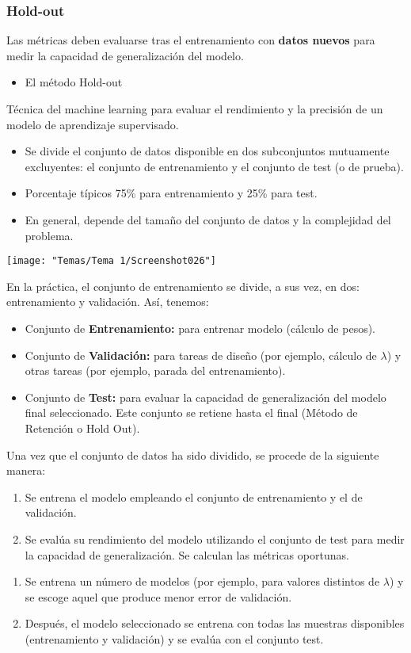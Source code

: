 \subsubsection{Hold-out}
Las métricas deben evaluarse tras el entrenamiento con \textbf{datos nuevos} para medir la capacidad de generalización del modelo. 
\begin{itemize}[label=\color{red}\textbullet, leftmargin=*]
	\item \color{lightblue}El método Hold-out
\end{itemize}
Técnica del machine learning para evaluar el rendimiento y la precisión de un modelo de aprendizaje supervisado.
\begin{itemize}
	\item Se divide el conjunto de datos disponible en dos subconjuntos mutuamente excluyentes: el conjunto de entrenamiento y el conjunto de test (o de prueba).
	\item Porcentaje típicos 75\% para entrenamiento y 25\% para test.
	\item En general, depende del tamaño del conjunto de datos y la complejidad del problema.
\end{itemize}
\begin{center}
	\texttt{[image: "Temas/Tema 1/Screenshot026"]}
\end{center}
En la práctica, el conjunto de entrenamiento se divide, a sus vez, en dos: entrenamiento y validación. Así, tenemos:
\begin{itemize}
	\item Conjunto de \textbf{Entrenamiento:} para entrenar modelo (cálculo de pesos).
	\item Conjunto de \textbf{Validación:} para tareas de diseño (por ejemplo, cálculo de $\lambda$) y otras tareas (por ejemplo, parada del entrenamiento).
	\item Conjunto de \textbf{Test:} para evaluar la capacidad de generalización del modelo final seleccionado. Este conjunto se retiene hasta el final (Método de Retención o Hold Out).
\end{itemize}

Una vez que el conjunto de datos ha sido dividido, se procede de la siguiente manera:
\begin{enumerate}[label=\color{lightblue}\arabic*)]
	\item Se entrena el modelo empleando el conjunto de entrenamiento y el de validación.
	\item Se evalúa su rendimiento del modelo utilizando el conjunto de test para medir la capacidad de generalización. Se calculan las métricas oportunas.
\end{enumerate}
\begin{enumerate}[label=\color{lightblue}\arabic*)]
	\item Se entrena un número de modelos (por ejemplo, para valores distintos de $\lambda$) y se escoge aquel que produce menor error de validación.
	\item Después, el modelo seleccionado se entrena con todas las muestras disponibles (entrenamiento y validación) y se evalúa con el conjunto test.
\end{enumerate}